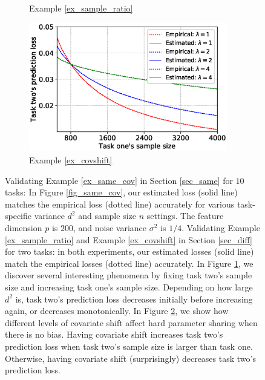 \begin{figure}[!t]
\begin{subfigure}[b]{0.33\textwidth}
		\caption{Example \ref{ex_sample_ratio}}
		\label{fig_size}
	\end{subfigure}\hfill
	\begin{subfigure}[b]{0.33\textwidth}
		\centering
		\includegraphics[width=0.95\textwidth]{figures/covariate_shift.eps}
		\caption{Example \ref{ex_covshift}}
		\label{fig_covariate}
	\end{subfigure}
	\caption{%
	Validating Example \ref{ex_same_cov} in Section \ref{sec_same} for $10$ tasks:
	In Figure \ref{fig_same_cov}, our estimated loss (solid line) matches the empirical loss (dotted line) accurately for various task-specific variance $d^2$ and sample size $n$ settings. The feature dimension $p$ is $200$, and noise variance $\sigma^2$ is $1/4$.
	Validating Example \ref{ex_sample_ratio} and Example \ref{ex_covshift} in Section \ref{sec_diff} for two tasks:
	in both experiments, our estimated losses (solid line) match the empirical losses (dotted line) accurately.
	In Figure \ref{fig_size}, we discover several interesting phenomena by fixing task two's sample size and increasing task one's sample size.
	Depending on how large $d^2$ is, task two's prediction loss decreases initially before increasing again, or decreases monotonically.
	In Figure \ref{fig_covariate}, we show how different levels of covariate shift affect hard parameter sharing when there is no bias.
	Having covariate shift increases task two's prediction loss when task two's sample size is larger than task one. Otherwise, having covariate shift (surprisingly) decreases task two's prediction loss.}
	\label{fig_model_shift_phasetrans}
\end{figure}



